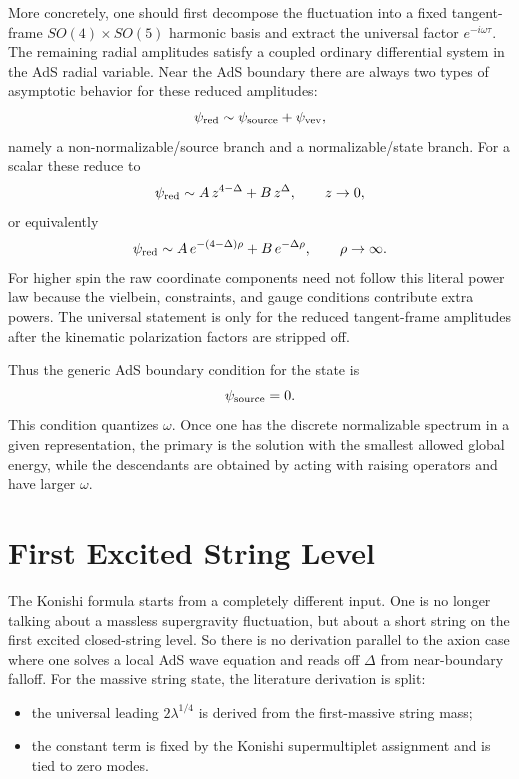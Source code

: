 \documentclass[12pt]{article}
\newcommand{\D}{\Delta}
\begin{document}
More concretely, one should first decompose the fluctuation into a fixed tangent-frame
$SO(4)\times SO(5)$ harmonic basis and extract the universal factor $e^{-i\omega\tau}$.  The remaining
radial amplitudes satisfy a coupled ordinary differential system in the AdS radial variable.  Near the
AdS boundary there are always two types of asymptotic behavior for these reduced amplitudes:
\begin{equation}
\psi_{\rm red}\sim \psi_{\rm source}+\psi_{\rm vev},
\end{equation}
namely a non-normalizable/source branch and a normalizable/state branch.  For a scalar these reduce to
\begin{equation}
\psi_{\rm red}\sim A\,z^{4-\D}+B\,z^\D,
\qquad z\to 0,
\end{equation}
or equivalently
\begin{equation}
\psi_{\rm red}\sim A\,e^{-(4-\D)\rho}+B\,e^{-\D\rho},
\qquad \rho\to\infty.
\end{equation}
For higher spin the raw coordinate components need not follow this literal power law because the vielbein,
constraints, and gauge conditions contribute extra powers.  The universal statement is only for the
reduced tangent-frame amplitudes after the kinematic polarization factors are stripped off.

Thus the generic AdS boundary condition for the state is
\begin{equation}
\psi_{\rm source}=0.
\end{equation}
This condition quantizes $\omega$.  Once one has the discrete normalizable spectrum in a given
representation, the primary is the solution with the smallest allowed global energy, while the
descendants are obtained by acting with raising operators and have larger $\omega$.

\section{First Excited String Level}

The Konishi formula starts from a completely different input.  One is no longer talking about a
massless supergravity fluctuation, but about a short string on the first excited closed-string level.
So there is no derivation parallel to the axion case where one solves a local AdS wave equation and reads
off $\D$ from near-boundary falloff.  For the massive string state, the literature derivation is split:
\begin{itemize}
\item the universal leading $2\lambda^{1/4}$ is derived from the first-massive string mass;
\item the constant term is fixed by the Konishi supermultiplet assignment and is tied to zero modes.
\end{itemize}
\end{document}
